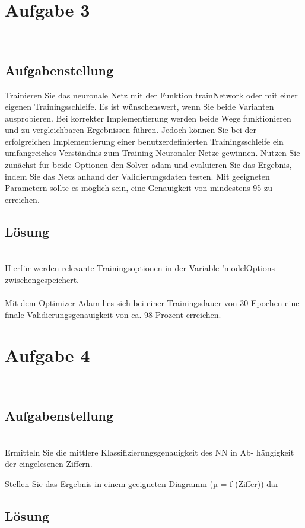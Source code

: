 \documentclass[8pt,a4paper]{article}
\begin{document}
\\
\section{Aufgabe 3}
\\
\subsection{Aufgabenstellung}
Trainieren Sie das neuronale Netz mit der Funktion trainNetwork oder
mit einer eigenen Trainingsschleife. Es ist wünschenswert, wenn Sie
beide Varianten ausprobieren. Bei korrekter Implementierung werden
beide Wege funktionieren und zu vergleichbaren Ergebnissen führen.
Jedoch können Sie bei der erfolgreichen Implementierung einer benutzerdefinierten Trainingsschleife ein umfangreiches Verständnis zum
Training Neuronaler Netze gewinnen. Nutzen Sie zunächst für beide
Optionen den Solver adam und evaluieren Sie das Ergebnis, indem Sie
das Netz anhand der Validierungsdaten testen. Mit geeigneten Parametern sollte es möglich sein, eine Genauigkeit von mindestens 95 %
zu erreichen.\\
\subsection{Lösung}
\\
Hierfür werden relevante Trainingsoptionen in der Variable 'modelOptions zwischengespeichert.
\\

\\
Mit dem Optimizer Adam lies sich bei einer Trainingsdauer von 30 Epochen eine finale Validierungsgenauigkeit von ca. 98 Prozent erreichen.
\\
\section{Aufgabe 4}
\\
\subsection{Aufgabenstellung}
\\Ermitteln Sie die mittlere Klassifizierungsgenauigkeit des NN in Ab-
hängigkeit der eingelesenen Ziffern.

Stellen Sie das Ergebnis in einem geeigneten Diagramm (µ = f (Ziffer))
dar
\subsection{Lösung}
\end{document}
